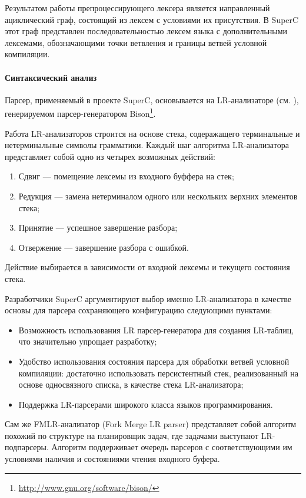 Результатом работы препроцессирующего лексера является направленный ациклический граф, состоящий из лексем с условиями их присутствия. В SuperC этот граф представлен последовательностью лексем языка с дополнительными лексемами, обозначающими точки ветвления и границы ветвей условной компиляции.

\paragraph{Синтаксический анализ}

Парсер, применяемый в проекте SuperC, основывается на LR-анализаторе (см. \cite{aho}), генерируемом парсер-генератором Bison\footnote{\url{http://www.gnu.org/software/bison/}}.

Работа LR-анализаторов строится на основе стека, содеражащего терминальные и нетерминальные символы грамматики. Каждый шаг алгоритма LR-анализатора представляет собой одно из четырех возможных действий: 

\begin{enumerate}
\item Сдвиг --- помещение лексемы из входного буффера на стек;
\item Редукция --- замена нетерминалом одного или нескольких верхних элементов стека;
\item Принятие --- успешное завершение разбора;
\item Отвержение --- завершение разбора с ошибкой. 
\end{enumerate}

Действие выбирается в зависимости от входной лексемы и текущего состояния стека.

Разработчики SuperC аргументируют выбор именно LR-анализатора в качестве основы для парсера сохраняющего конфигурацию следующими пунктами:

\begin{itemize}
\item Возможность использования LR парсер-генератора для создания LR-таблиц, что значительно упрощает разработку;
\item Удобство использования состояния парсера для обработки ветвей условной компиляции: достаточно использовать персистентный стек, реализованный на основе односвязного списка, в качестве стека LR-анализатора;
\item Поддержка LR-парсерами широкого класса языков программирования.
\end{itemize}

Сам же FMLR-анализатор (Fork Merge LR parser) представляет собой алгоритм похожий по структуре на планировщик задач, где задачами выступают LR-подпарсеры. Алгоритм поддерживает очередь парсеров с соответствующими им условиями наличия и состояниями чтения входного буфера.

